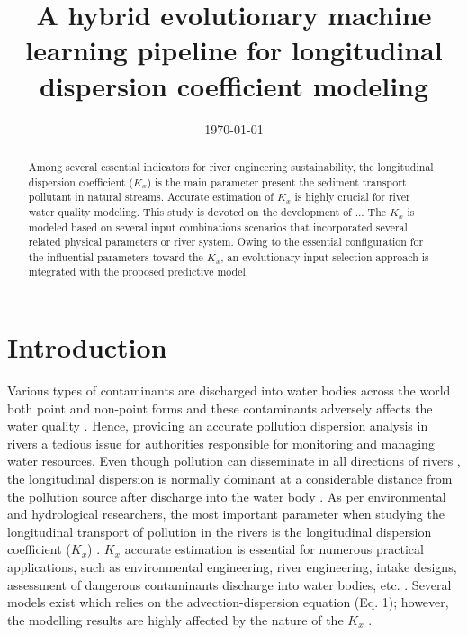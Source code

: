 \documentclass[a4paper,12pt, english]{article}
\title{A hybrid evolutionary machine learning pipeline for longitudinal dispersion coefficient modeling}
\author{}
\date{\today}
\begin{document}
\maketitle
\begin{abstract}
Among several essential indicators for river engineering sustainability, the longitudinal dispersion coefficient ($K_x$) is the main parameter present the sediment transport pollutant in natural streams. Accurate estimation of $K_x$ is highly crucial for river water quality modeling. This study is devoted on the development of ...
The $K_x$ is modeled based on several input combinations scenarios that incorporated several related physical parameters or river system. Owing to the essential configuration for the influential parameters toward the $K_x$, an evolutionary input selection approach is integrated with the proposed predictive model.     
 
\end{abstract}

\section{\label{sec:intro} Introduction}

Various types of contaminants are discharged into water bodies across the world both point and non-point forms and these contaminants adversely affects the water quality \cite{noori2007assessment}. Hence, providing an accurate pollution dispersion analysis in rivers a tedious issue for authorities responsible for monitoring and managing water resources. Even though pollution can disseminate in all directions of rivers \cite{tayfur2005predicting}, the longitudinal dispersion is normally dominant at a considerable distance from the pollution source after discharge into the water body \cite{riahi2009expert}. As per environmental and hydrological researchers, the most important parameter when studying the longitudinal transport of pollution in the rivers is the longitudinal dispersion coefficient ($K_x$) \cite{kashefipour2002longitudinal, etemad2012predicting, hamidifar2015longitudinal, dehghani2020novel, wang2017physically, farzadkhoo2018comparative, baek2019deriving, farzadkhoo2019flow}. $K_x$ accurate estimation is essential for numerous practical applications, such as environmental engineering, river engineering, intake designs, assessment of dangerous contaminants discharge into water bodies, etc. \cite{alizadeh2017improvement}. Several models exist which relies on the advection-dispersion equation (Eq. 1); however, the modelling results are highly affected by the nature of the $K_x$ \cite{noori2016reliable}.
\end{document}

